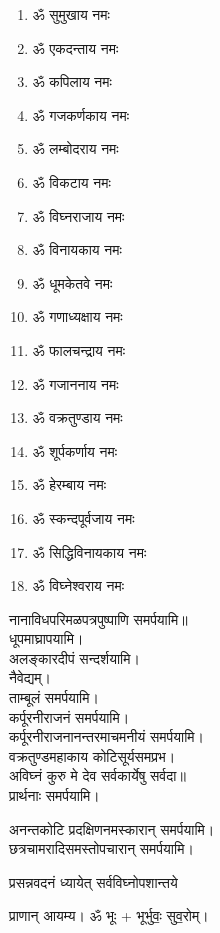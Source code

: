\setlength{\columnseprule}{0pt}
\renewcommand{\labelenumi}{\devanumber\theenumi.}
\begin{multicols}{2}
\begin{enumerate}
\item ॐ सुमुखाय नमः
\item ॐ एकदन्ताय नमः
\item ॐ कपिलाय नमः
\item ॐ गजकर्णकाय नमः
\item ॐ लम्बोदराय नमः
\item ॐ विकटाय नमः
\item ॐ विघ्नराजाय नमः
\item ॐ विनायकाय नमः
\item ॐ धूमकेतवे नमः
\item ॐ गणाध्यक्षाय नमः
\item ॐ फालचन्द्राय नमः
\item ॐ गजाननाय नमः
\item ॐ वक्रतुण्डाय नमः
\item ॐ शूर्पकर्णाय नमः
\item ॐ हेरम्बाय नमः
\item ॐ स्कन्दपूर्वजाय नमः
\item ॐ सिद्धिविनायकाय नमः
\item ॐ विघ्नेश्वराय नमः
\end{enumerate}
\end{multicols}
नानाविधपरिमळपत्रपुष्पाणि समर्पयामि॥\\
धूपमाघ्रापयामि।\\
अलङ्कारदीपं सन्दर्शयामि।\\
नैवेद्यम्।\\
ताम्बूलं समर्पयामि।\\
कर्पूरनीराजनं समर्पयामि।\\
कर्पूरनीराजनानन्तरमाचमनीयं समर्पयामि।\\
{वक्रतुण्डमहाकाय कोटिसूर्यसमप्रभ।}\\
{अविघ्नं कुरु मे देव सर्वकार्येषु सर्वदा॥}\\
प्रार्थनाः समर्पयामि।

अनन्तकोटि प्रदक्षिणनमस्कारान् समर्पयामि।\\
छत्रचामरादिसमस्तोपचारान् समर्पयामि।\\


{प्रसन्नवदनं ध्यायेत् सर्वविघ्नोपशान्तये}
 
प्राणान्  आयम्य।  ॐ भूः + भूर्भुवः॒ सुव॒रोम्।


